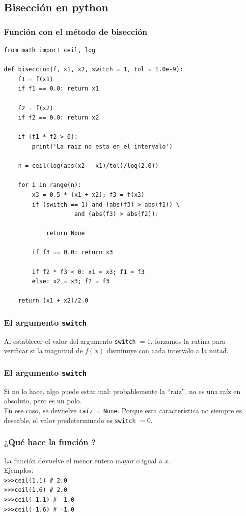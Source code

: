 \documentclass[12pt]{beamer}
\begin{document}
\subsection{Bisección en python}

\begin{frame}
\frametitle{Función con el método de bisección}
\begin{lstlisting}[caption=Método de bisección con \python]
from math import ceil, log

def biseccion(f, x1, x2, switch = 1, tol = 1.0e-9):
    f1 = f(x1)
    if f1 == 0.0: return x1
    
    f2 = f(x2)
    if f2 == 0.0: return x2
    
    if (f1 * f2 > 0):
        print('La raiz no esta en el intervalo')

    n = ceil(log(abs(x2 - x1)/tol)/log(2.0))
    
    for i in range(n):
        x3 = 0.5 * (x1 + x2); f3 = f(x3)
        if (switch == 1) and (abs(f3) > abs(f1)) \
                    and (abs(f3) > abs(f2)):
                        
            return None
        
        if f3 == 0.0: return x3

        if f2 * f3 < 0: x1 = x3; f1 = f3
        else: x2 = x3; f2 = f3
    
    return (x1 + x2)/2.0
\end{lstlisting}
\end{frame}
\begin{frame}
\frametitle{El argumento \texttt{switch}}
Al establecer el valor del argumento \texttt{switch} $=1$, forzamos la rutina para verificar si la magnitud de $f (x)$ disminuye con cada intervalo
a la mitad.
\end{frame}
\begin{frame}
\frametitle{El argumento \texttt{switch}}
Si no lo hace, algo puede estar mal: \pause probablemente la \enquote{raíz}, no es una raíz en absoluto, pero es un polo.
\\
\bigskip
\pause
En ese caso, se devuelve \texttt{raíz = None}. Porque esta característica no siempre es deseable, el valor predeterminado es \texttt{switch} $= 0$.
\end{frame}
\begin{frame}[fragile]
\frametitle{¿Qué hace la función ?}
La función  devuelve el menor entero mayor o igual a $x$.
\\
\medskip
\pause
Ejemplos:\\
\medskip
\verb|>>>ceil(1.1) # 2.0| \\ \pause
\verb|>>>ceil(1.6) # 2.0| \\ \pause
\verb|>>>ceil(-1.1) # -1.0| \\ \pause
\verb|>>>ceil(-1.6) # -1.0|
\end{frame}
\end{document}
